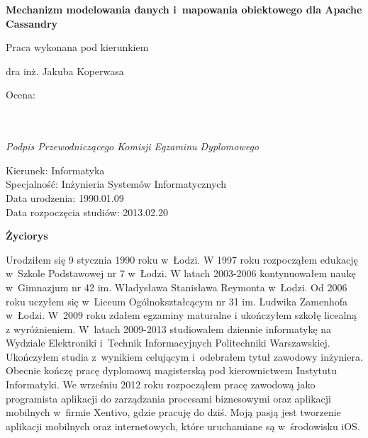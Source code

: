 \begin{titlepage}
\begin{center}
  \textbf{Mechanizm modelowania danych i~mapowania obiektowego dla Apache Cassandry}
 \end{center}
 
 \vspace{1.5cm}
 
 \hfill Praca wykonana pod kierunkiem
 
 \hfill dra inż. Jakuba Koperwasa
 
 \vspace{1.5cm}

 \begin{flushleft}
  \begin{minipage}{7cm}
   Ocena: \dotfill \\ \\
   \hspace*{0cm} \dotfill \\[-0.7cm]
   \begin{center}
    \small\textit{Podpis Przewodniczącego Komisji Egzaminu Dyplomowego}
   \end{center}
  \end{minipage}
 \end{flushleft}

\end{titlepage}


\newpage
\thispagestyle{empty}

\begin{flushright}
  Kierunek: Informatyka \\
  Specjalność: Inżynieria Systemów Informatycznych \\
  Data urodzenia: 1990.01.09 \\
  Data rozpoczęcia studiów: 2013.02.20 \\
\end{flushright}

\vspace{0.5cm}

\begin{center}
  \textbf{\textbf{Życiorys}}
\end{center}

\vspace{0.5cm}
 
Urodziłem się 9 stycznia 1990 roku w~Łodzi. W 1997 roku rozpocząłem edukację w~Szkole Podstawowej nr 7 w~Łodzi. W latach 2003-2006 kontynuowałem naukę w~Gimnazjum nr 42 im. Władysława Stanisława Reymonta w~Łodzi. Od 2006 roku uczyłem się w~Liceum Ogólnokształcącym nr 31 im. Ludwika Zamenhofa w~Łodzi. W~2009 roku zdałem egzaminy maturalne i ukończyłem szkołę licealną z wyróżnieniem. W~latach 2009-2013 studiowałem dziennie informatykę na Wydziale Elektroniki i~Technik Informacyjnych Politechniki Warszawskiej. Ukończyłem studia z~wynikiem celującym i~odebrałem tytuł zawodowy inżyniera. Obecnie kończę pracę dyplomową magisterską pod kierownictwem Instytutu Informatyki. We wrześniu 2012 roku rozpocząłem pracę zawodową jako programista aplikacji do zarządzania procesami biznesowymi oraz aplikacji mobilnych w~firmie Xentivo, gdzie pracuję do dziś. Moją pasją jest tworzenie aplikacji mobilnych oraz internetowych, które uruchamiane są w~środowisku iOS.
 

